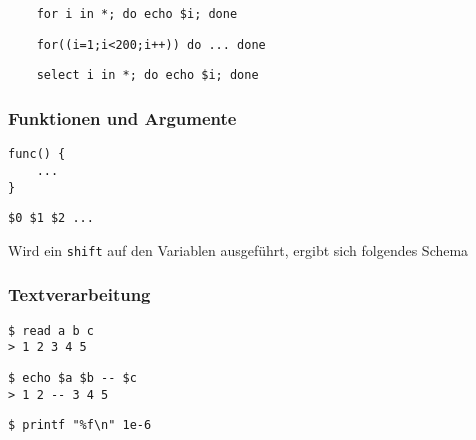 			\begin{lstlisting}
	for i in *; do echo $i; done
			\end{lstlisting}
			\lstBash
			\begin{lstlisting}
	for((i=1;i<200;i++)) do ... done
			\end{lstlisting}
			\begin{lstlisting}
	select i in *; do echo $i; done
			\end{lstlisting}
		

		\subsubsection*{Funktionen und Argumente} %
		\label{ssub:funktionen_und_argumente}
		
			\begin{lstlisting}
func() {
	...
}
			\end{lstlisting}
			\lstBash
			\begin{lstlisting}
$0 $1 $2 ...
			\end{lstlisting}
			Wird ein \texttt{shift} auf den Variablen ausgeführt, ergibt sich folgendes Schema\\


		\subsubsection*{Textverarbeitung} %
		\label{ssub:textverarbeitung}
		
		\begin{lstlisting}
$ read a b c
> 1 2 3 4 5
		\end{lstlisting}
		\begin{lstlisting}
$ echo $a $b -- $c
> 1 2 -- 3 4 5
		\end{lstlisting}
		\begin{lstlisting}
$ printf "%f\n" 1e-6
		\end{lstlisting}

